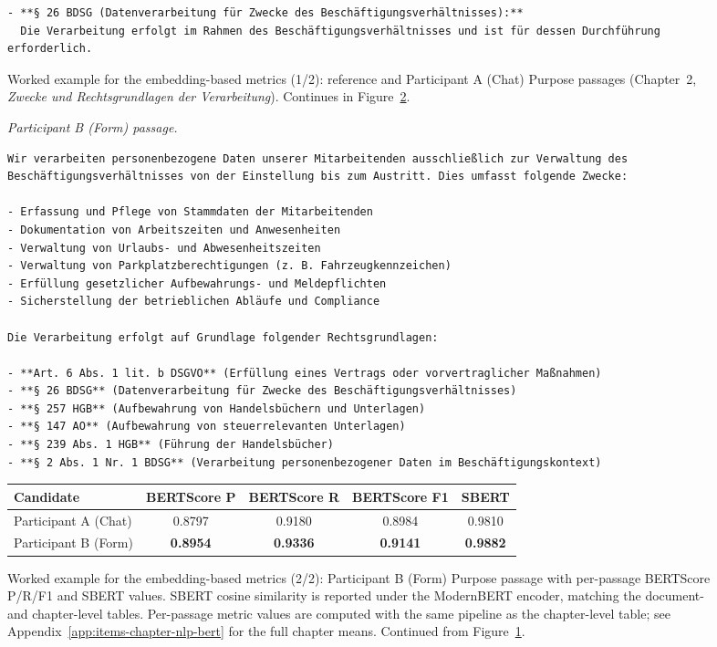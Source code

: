 \begin{figure}[!htbp]
\begin{lstlisting}
- **§ 26 BDSG (Datenverarbeitung für Zwecke des Beschäftigungsverhältnisses):**
  Die Verarbeitung erfolgt im Rahmen des Beschäftigungsverhältnisses und ist für dessen Durchführung erforderlich.
\end{lstlisting}

\caption{Worked example for the embedding-based metrics (1/2):
reference and Participant A (Chat) Purpose passages (Chapter~2,
\emph{Zwecke und Rechtsgrundlagen der Verarbeitung}). Continues
in Figure~\ref{fig:worked-semantic-b}.}
\label{fig:worked-semantic-a}
\end{figure}

\clearpage

\begin{figure}[!htbp]
\centering
\noindent\textit{Participant B (Form) passage.}
\begin{lstlisting}
Wir verarbeiten personenbezogene Daten unserer Mitarbeitenden ausschließlich zur Verwaltung des Beschäftigungsverhältnisses von der Einstellung bis zum Austritt. Dies umfasst folgende Zwecke:

- Erfassung und Pflege von Stammdaten der Mitarbeitenden
- Dokumentation von Arbeitszeiten und Anwesenheiten
- Verwaltung von Urlaubs- und Abwesenheitszeiten
- Verwaltung von Parkplatzberechtigungen (z. B. Fahrzeugkennzeichen)
- Erfüllung gesetzlicher Aufbewahrungs- und Meldepflichten
- Sicherstellung der betrieblichen Abläufe und Compliance

Die Verarbeitung erfolgt auf Grundlage folgender Rechtsgrundlagen:

- **Art. 6 Abs. 1 lit. b DSGVO** (Erfüllung eines Vertrags oder vorvertraglicher Maßnahmen)
- **§ 26 BDSG** (Datenverarbeitung für Zwecke des Beschäftigungsverhältnisses)
- **§ 257 HGB** (Aufbewahrung von Handelsbüchern und Unterlagen)
- **§ 147 AO** (Aufbewahrung von steuerrelevanten Unterlagen)
- **§ 239 Abs. 1 HGB** (Führung der Handelsbücher)
- **§ 2 Abs. 1 Nr. 1 BDSG** (Verarbeitung personenbezogener Daten im Beschäftigungskontext)
\end{lstlisting}

\vspace{0.5ex}
\begin{tabular}{@{}l c c c c@{}}
\toprule
Candidate    & BERTScore P & BERTScore R & BERTScore F1 & SBERT \\
\midrule
Participant A (Chat) & 0.8797      & 0.9180      & 0.8984       & 0.9810 \\
Participant B (Form) & \textbf{0.8954}      & \textbf{0.9336}      & \textbf{0.9141}       & \textbf{0.9882} \\
\bottomrule
\end{tabular}
\caption{Worked example for the embedding-based metrics (2/2):
Participant B (Form) Purpose passage with per-passage BERTScore P/R/F1
and SBERT values. SBERT cosine similarity is reported under the
ModernBERT encoder, matching the document- and chapter-level
tables. Per-passage metric values are computed with the same
pipeline as the chapter-level table; see
Appendix~\ref{app:items-chapter-nlp-bert} for the full chapter
means. Continued from Figure~\ref{fig:worked-semantic-a}.}
\label{fig:worked-semantic-b}
\end{figure}
\endgroup

